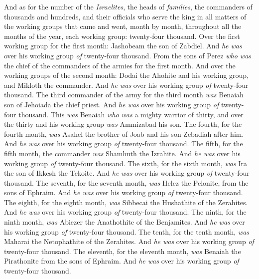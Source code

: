 \begin{biblechapter} %
 And as for the number of the \textit{Israelites}, the heads of \textit{families}, the commanders of thousands and hundreds, and their officials who serve the king in all matters of the working groups that came and went, month by month, throughout all the months of the year, each working group: twenty-four thousand.
\verse Over the first working group for the first month: Jashobeam the son of Zabdiel. And \textit{he was} over his working group \textit{of} twenty-four thousand.
\verse From the sons of Perez \textit{who was} the chief of the commanders of the armies for the first month.
\verse And over the working groups of the second month: Dodai the Ahohite and his working group, and Mikloth the commander. And \textit{he was} over his working group \textit{of} twenty-four thousand.
\verse The third commander of the army for the third month \textit{was} Benaiah son of Jehoiada the chief priest. And \textit{he was} over his working group \textit{of} twenty-four thousand.
\verse This \textit{was} Benaiah \textit{who was} a mighty warrior of thirty, and over the thirty and his working group \textit{was} Ammizabad his son.
\verse The fourth, for the fourth month, \textit{was} Asahel the brother of Joab and his son Zebadiah after him. And \textit{he was} over his working group \textit{of} twenty-four thousand.
\verse The fifth, for the fifth month, the commander \textit{was} Shamhuth the Izrahite. And \textit{he was} over his working group \textit{of} twenty-four thousand.
\verse The sixth, for the sixth month, \textit{was} Ira the son of Ikkesh the Tekoite. And \textit{he was} over his working group \textit{of} twenty-four thousand.
\verse The seventh, for the seventh month, \textit{was} Helez the Pelonite, from the sons of Ephraim. And \textit{he was} over his working group \textit{of} twenty-four thousand.
\verse The eighth, for the eighth month, \textit{was} Sibbecai the Hushathite of the Zerahites. And \textit{he was} over his working group \textit{of} twenty-four thousand.
\verse The ninth, for the ninth month, \textit{was} Abiezer the Anathothite of the Benjamites. And \textit{he was} over his working group \textit{of} twenty-four thousand.
\verse The tenth, for the tenth month, \textit{was} Maharai the Netophathite of the Zerahites. And \textit{he was} over his working group \textit{of} twenty-four thousand.
\verse The eleventh, for the eleventh month, \textit{was} Benaiah the Pirathonite from the sons of Ephraim. And \textit{he was} over his working group \textit{of} twenty-four thousand.

\end{biblechapter}
